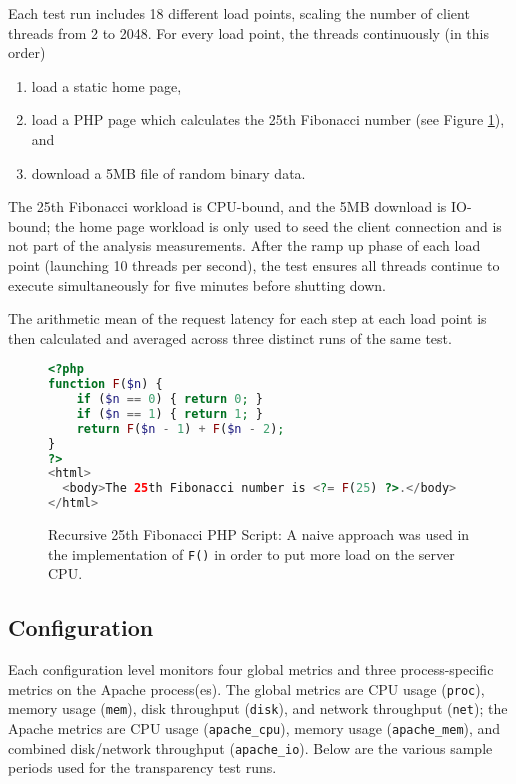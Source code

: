 Each test run includes 18 different load points, scaling the number of client threads from 2 to 2048. For every load
point, the threads continuously (in this order)

\begin{enumerate}
\item load a static home page,
\item load a PHP page which calculates the 25th Fibonacci number (see Figure \ref{fig:fib25_list}), and
\item download a 5MB file of random binary data.
\end{enumerate}

The 25th Fibonacci workload is CPU-bound, and the 5MB download is IO-bound; the home page workload is only used to
seed the client connection and is not part of the analysis measurements. After the ramp up phase of each load point
(launching 10 threads per second), the test ensures all threads continue to execute simultaneously for five minutes
before shutting down.

The arithmetic mean of the request latency for each step at each load point is then calculated and averaged across three
distinct runs of the same test.

\begin{figure}[H]
\vspace{+10pt}
\begin{lstlisting}[language=php,frame=single,basicstyle=\footnotesize\ttfamily]
<?php
function F($n) {
    if ($n == 0) { return 0; }
    if ($n == 1) { return 1; }
    return F($n - 1) + F($n - 2);
}
?>
<html>
  <body>The 25th Fibonacci number is <?= F(25) ?>.</body>
</html>
\end{lstlisting}
\vspace{-10pt}
\caption[Recursive 25th Fibonacci PHP Script]
	{Recursive 25th Fibonacci PHP Script: A naive approach was used in the implementation of \texttt{F()} in order
	 to put more load on the server CPU.}
\label{fig:fib25_list}
\end{figure}

\subsection{\dcamp Configuration}

Each \dcamp configuration level monitors four global metrics and three process-specific metrics on the Apache
process(es). The global metrics are CPU usage (\texttt{proc}), memory usage (\texttt{mem}), disk throughput
(\texttt{disk}), and network throughput (\texttt{net}); the Apache metrics are CPU usage (\texttt{apache\_cpu}), memory
usage (\texttt{apache\_mem}), and combined disk/network throughput (\texttt{apache\_io}). Below are the various sample
periods used for the transparency test runs.

